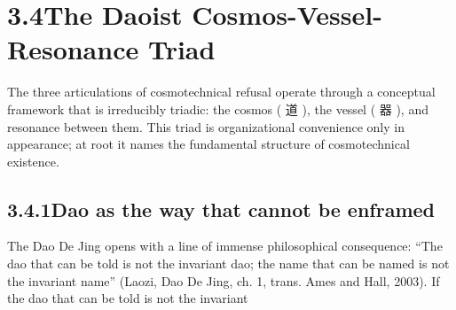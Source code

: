 \section{3.4\quad The Daoist Cosmos-Vessel-Resonance Triad}

The three articulations of cosmotechnical refusal operate through a conceptual framework that is irreducibly triadic: the cosmos ( 道 ), the vessel ( 器 ), and resonance between them. This triad is organizational convenience only in appearance; at root it names the fundamental structure of cosmotechnical existence.

\subsection{3.4.1\quad Dao as the way that cannot be enframed}

The Dao De Jing opens with a line of immense philosophical consequence: “The dao that can be told is not the invariant dao; the name that can be named is not the invariant name” (Laozi, Dao De Jing, ch. 1, trans. Ames and Hall, 2003). If the dao that can be told is not the invariant

